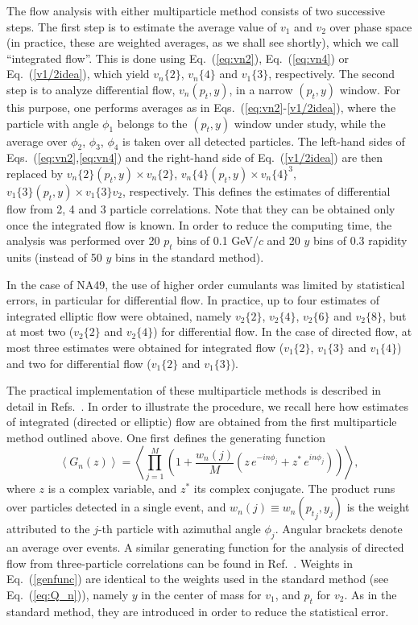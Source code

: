 \documentclass[aps,prc,superscriptaddress,showpacs,floatfix,nofootinbib]{revtex4}
\newcommand{\mean}[1]{\left\langle #1 \right\rangle}
\begin{document}
The flow analysis with either multiparticle method consists of two
successive steps. The first step is to estimate the average value of
$v_1$ and $v_2$ over phase space (in practice, these are weighted
averages, as we shall see shortly), which we call ``integrated
flow''. This is done using Eq.~(\ref{eq:vn2}), Eq.~(\ref{eq:vn4}) or
Eq.~(\ref{v1/2idea}), which yield $v_n\{2\}$, $v_n\{4\}$ and
$v_1\{3\}$, respectively.  The second step is to analyze differential
flow, $v_n(p_t,y)$, in a narrow $(p_t,y)$ window.  For this purpose,
one performs averages as in Eqs.~(\ref{eq:vn2}-\ref{v1/2idea}), where
the particle with angle $\phi_1$ belongs to the $(p_t,y)$ window under
study, while the average over $\phi_2$, $\phi_3$, $\phi_4$ is taken
over all detected particles. The left-hand sides of
Eqs.~(\ref{eq:vn2},\ref{eq:vn4}) and the right-hand side of
Eq.~(\ref{v1/2idea}) are then replaced by $v_n\{2\}(p_t,y)\times
v_n\{2\}$, $v_n\{4\}(p_t,y)\times v_n\{4\}^3$, $v_1\{3\}(p_t,y) \times
v_1\{3\} v_2$, respectively.  This defines the estimates of
differential flow from 2, 4 and 3 particle correlations. Note that
they can be obtained only once the integrated flow is known.  In order
to reduce the computing time, the analysis was performed over 20 $p_t$
bins of 0.1 GeV/$c$ and 20 $y$ bins of 0.3 rapidity units (instead of
50 $y$ bins in the standard method).


In the case of NA49, the use of higher order cumulants was limited by
statistical errors, in particular for differential flow.  In practice,
up to four estimates of integrated elliptic flow were obtained, namely
$v_2\{2\}$, $v_2\{4\}$, $v_2\{6\}$ and $v_2\{8\}$, but at most two
($v_2\{2\}$ and $v_2\{4\}$) for differential flow.  In the case of
directed flow, at most three estimates were obtained for integrated
flow ($v_1\{2\}$, $v_1\{3\}$ and $v_1\{4\}$) and two for differential
flow ($v_1\{2\}$ and $v_1\{3\}$).

The practical implementation of these multiparticle methods is
described in detail in Refs.~\cite{Borghini:2001vi,Borghini:2002vp}.
In order to illustrate the procedure, we recall here how estimates of
integrated (directed or elliptic) flow are obtained from the first
multiparticle method outlined above.  One first defines the generating
function
\begin{equation}
\label{genfunc}
\mean{G_n(z)} = \mean{\prod_{j=1}^M 
\left( 1+ \frac{w_n(j)}{M} (z\,e^{-in\phi_j} + z^*\,e^{in\phi_j}) \right)},
\end{equation}
where $z$ is a complex variable, and $z^*$ its complex conjugate.  The
product runs over particles detected in a single event, and
$w_n(j)\equiv w_n({p_t}_j, y_j)$ is the weight attributed to the
$j$-th particle with azimuthal angle $\phi_j$. Angular brackets denote
an average over events.  A similar generating function for the
analysis of directed flow from three-particle correlations can be
found in Ref.~\cite{Borghini:2002vp}. Weights in Eq.~(\ref{genfunc})
are identical to the weights used in the standard method (see Eq.\
(\ref{eq:Q_n})), namely $y$ in the center of mass for $v_1$, and $p_t$
for $v_2$.  As in the standard method, they are introduced in order to
reduce the statistical error.
\end{document}
